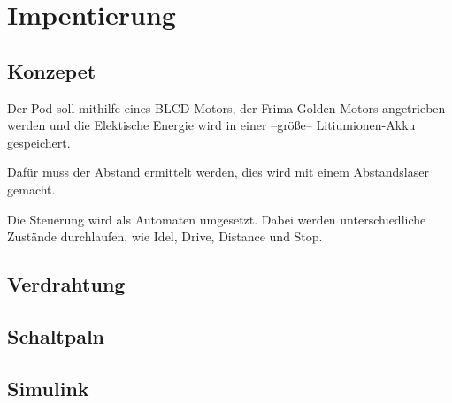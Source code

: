\chapter{Impentierung}

\section{Konzepet}
Der Pod soll mithilfe eines BLCD Motors, der Frima Golden Motors angetrieben werden und die Elektische Energie wird in einer --größe-- Litiumionen-Akku gespeichert.


Dafür muss der Abstand ermittelt werden, dies wird mit einem Abstandslaser gemacht.

Die Steuerung wird als Automaten umgesetzt. Dabei werden unterschiedliche Zustände durchlaufen, wie Idel, Drive, Distance und Stop.
\newline


\section{Verdrahtung}

\section{Schaltpaln}

\section{Simulink}

\